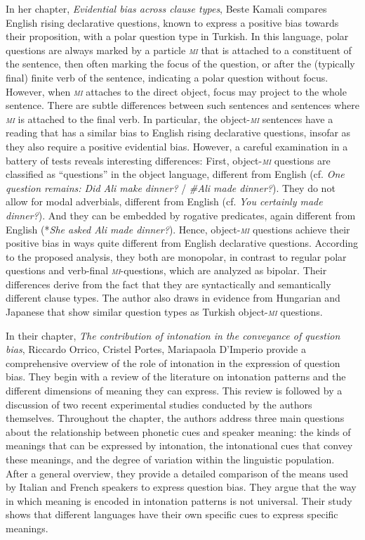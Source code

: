 \documentclass[output=paper,colorlinks,citecolor=brown]{langscibook}
\begin{document}
In her chapter, \textit{Evidential bias across clause types}, Beste Kamali compares English rising declarative questions, known to express a positive bias towards their proposition, with a polar question type in Turkish. In this language, polar questions are always marked by a particle \textit{\textsc{mi}} that is attached to a constituent of the sentence, then often marking the focus of the question, or after the (typically final) finite verb of the sentence, indicating a polar question without focus. However, when \textit{\textsc{mi}} attaches to the direct object, focus may project to the whole sentence. There are subtle differences between such sentences and sentences where \textit{\textsc{mi}} is attached to the final verb. In particular, the object-\textit{\textsc{mi}} sentences have a reading that has a similar bias to English rising declarative questions, insofar as they also require a positive evidential bias. However, a careful examination in a battery of tests reveals interesting differences: First, object-\textit{\textsc{mi}} questions are classified as ``questions'' in the object language, different from English (cf. \textit{One question remains: Did Ali make dinner?} / \textit{\#Ali made dinner?}). They do not allow for modal adverbials, different from English (cf. \textit{You certainly made dinner?}). And they can be embedded by rogative predicates, again different from English (*\textit{She asked Ali made dinner?}).  Hence, object-\textit{\textsc{mi}} questions achieve their positive bias in ways quite different from English declarative questions. According to the proposed analysis, they both are monopolar, in contrast to regular polar questions and verb-final \textit{\textsc{mi}}-questions, which are analyzed as bipolar. Their differences derive from the fact that they are syntactically and semantically different clause types. The author also draws in evidence from Hungarian and Japanese that show similar question types as Turkish object-\textit{\textsc{mi}} questions. 


In their chapter, \textit{The contribution of intonation in the conveyance of question bias}, Riccardo Orrico, Cristel Portes, Mariapaola D'Imperio provide a comprehensive overview of the role of intonation in the expression of question bias. They begin with a review of the literature on intonation patterns and the different dimensions of meaning they can express. This review is followed by a discussion of two recent experimental studies conducted by the authors themselves. Throughout the chapter, the authors address three main questions about the relationship between phonetic cues and speaker meaning: the kinds of meanings that can be expressed by intonation, the intonational cues that convey these meanings, and the degree of variation within the linguistic population. After a general overview, they provide a detailed comparison of the means used by Italian and French speakers to express question bias. They argue that the way in which meaning is encoded in intonation patterns is not universal. Their study shows that different languages have their own specific cues to express specific meanings.  
\end{document}
